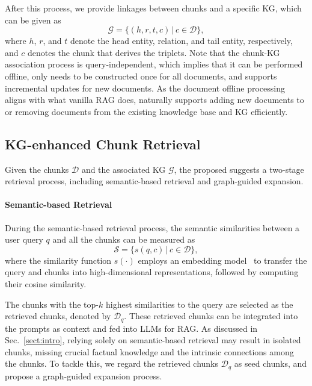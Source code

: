 After this process, we provide linkages between chunks and a specific KG, which can be given as
\begin{equation}
    \mathcal{G} = \{(h,r,t,c)\,|\,c\in \mathcal{D}\}, 
\end{equation}
where $h$, $r$, and $t$ denote the head entity, relation, and tail entity, respectively, and $c$ denotes the chunk that derives the triplets.
Note that the chunk-KG association process is query-independent, which implies that it can be performed offline, only needs to be constructed once for all documents, and supports incremental updates for new documents.
As the document offline processing aligns with what vanilla RAG does, \modelname naturally supports adding new documents to or removing documents from the existing knowledge base and KG efficiently.

\subsection{KG-enhanced Chunk Retrieval}
\label{subsec:retrieval}
Given the chunks $\mathcal{D}$ and the associated KG $\mathcal{G}$, the proposed \modelname suggests a two-stage retrieval process, including semantic-based retrieval and graph-guided expansion. 

\paragraph{Semantic-based Retrieval}
During the semantic-based retrieval process, the semantic similarities between a user query $q$ and all the chunks can be measured as
\begin{equation}
\mathcal{S} = \{s(q,c)\,|\,c\in\mathcal{D}\},
\label{eq:embedding_retrieval}
\end{equation}
where the similarity function $s(\cdot)$ employs an embedding model~\cite{zach24nomic,li24mxbai} to transfer the query and chunks into high-dimensional representations, followed by computing their cosine similarity.

The chunks with the top-$k$ highest similarities to the query are selected as the retrieved chunks, denoted by $\mathcal{D}_q$. These retrieved chunks can be integrated into the prompts as context and fed into LLMs for RAG. 
As discussed in Sec.~\ref{sect:intro}, relying solely on semantic-based retrieval may result in isolated chunks, missing crucial factual knowledge and the intrinsic connections among the chunks.
To tackle this, we regard the retrieved chunks $\mathcal{D}_q$ as seed chunks, and propose a graph-guided expansion process.


